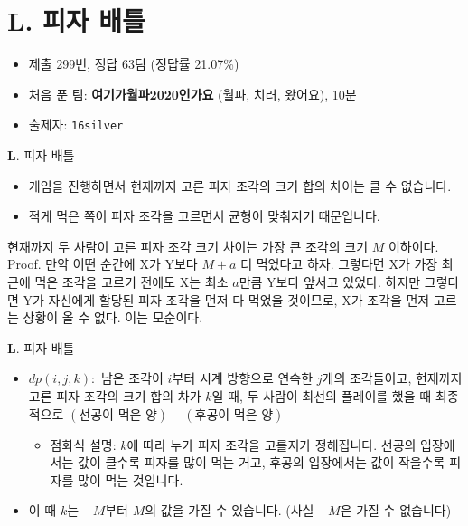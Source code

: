 \section{L. 피자 배틀}

\begin{frame} %
    \begin{itemize}
        \item 제출 299번, 정답 63팀 (정답률 21.07\%)
        \item 처음 푼 팀: \textbf{여기가월파2020인가요} (월파, 치러, 왔어요), 10분
        \item 출제자: \texttt{16silver}
    \end{itemize}
\end{frame}

\begin{frame}{\textbf{L}. 피자 배틀}
    \begin{itemize}
        \item 게임을 진행하면서 현재까지 고른 피자 조각의 크기 합의 차이는 클 수 없습니다.
        \item 적게 먹은 쪽이 피자 조각을 고르면서 균형이 맞춰지기 때문입니다.
    \end{itemize}
    \begin{block}{현재까지 두 사람이 고른 피자 조각 크기 차이는 가장 큰 조각의 크기 $M$ 이하이다.}
    Proof. 만약 어떤 순간에 X가 Y보다 $M+a$ 더 먹었다고 하자. 그렇다면 X가 가장 최근에 먹은 조각을 고르기 전에도 X는 최소 $a$만큼 Y보다 앞서고 있었다. 하지만 그렇다면 Y가 자신에게 할당된 피자 조각을 먼저 다 먹었을 것이므로, X가 조각을 먼저 고르는 상황이 올 수 없다. 이는 모순이다.
    \end{block}
\end{frame}

\begin{frame}{\textbf{L}. 피자 배틀}
    \begin{itemize}
        \item $dp(i,j,k):$ 남은 조각이 $i$부터 시계 방향으로 연속한 $j$개의 조각들이고, 현재까지 고른 피자 조각의 크기 합의 차가 $k$일 때, 두 사람이 최선의 플레이를 했을 때 최종적으로 $(\textrm{선공이 먹은 양})-(\textrm{후공이 먹은 양})$
        \begin{itemize}
            \item 점화식 설명: $k$에 따라 누가 피자 조각을 고를지가 정해집니다. 선공의 입장에서는 값이 클수록 피자를 많이 먹는 거고, 후공의 입장에서는 값이 작을수록 피자를 많이 먹는 것입니다.
        \end{itemize}
        \item 이 때 $k$는 $-M$부터 $M$의 값을 가질 수 있습니다. (사실 $-M$은 가질 수 없습니다)
    \end{itemize}
\end{frame}

